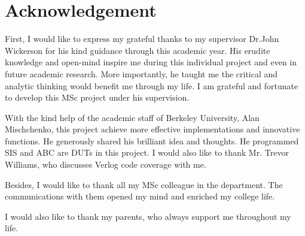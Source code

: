 \renewcommand{\baselinestretch}{1.5}
\chapter{Acknowledgement}
\renewcommand{\baselinestretch}{\mystretch}
First, I would like to express my grateful thanks to my supervisor Dr.John Wickerson for his kind guidance through this academic year. His erudite knowledge and open-mind inspire me during this individual project and even in future academic research. More importantly, he taught me the critical and analytic thinking would benefit me through my life. I am grateful and fortunate to develop this MSc project under his supervision.

With the kind help of the academic staff of Berkeley University, Alan Mischchenko, this project achieve more effective implementations and innovative functions. He generously shared his brilliant idea and thoughts. He programmed SIS and ABC are DUTs in this project. I would also like to thank Mr. Trevor Williams, who discusses Verlog code coverage with me.

Besides, I would like to thank all my MSc colleague in the department. The communications with them opened my mind and enriched my college life.

I would also like to thank my parents, who always support me throughout my life.










